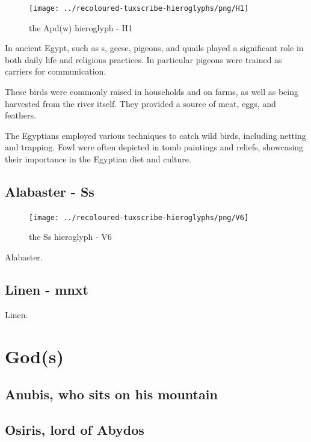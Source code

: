 \begin{figure} [H]
	\centering
	\texttt{[image: ../recoloured-tuxscribe-hieroglyphs/png/H1]}
	\caption{the Apd(w) hieroglyph - H1}
\end{figure}

In ancient Egypt,  such as s, geese, pigeons, and quails played a significant role in both daily life and religious practices. In particular pigeons were trained as carriers for communication.

These birds were commonly raised in households and on farms, as well as being harvested from the river itself. They provided a source of meat, eggs, and feathers.

The Egyptians employed various techniques to catch wild birds, including netting and trapping. Fowl were often depicted in tomb paintings and reliefs, showcasing their importance in the Egyptian diet and culture.

\subsection*{Alabaster - Ss}

\begin{figure} [H]
	\centering
	\texttt{[image: ../recoloured-tuxscribe-hieroglyphs/png/V6]}
	\caption{the Ss hieroglyph - V6}
\end{figure}

Alabaster.

\subsection*{Linen - mnxt}

Linen.

\section*{God(s)}

\subsection*{Anubis, who sits on his mountain}

\subsection*{Osiris, lord of Abydos}

